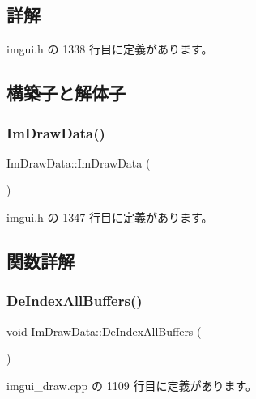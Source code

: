 \subsection{詳解}


 imgui.\+h の 1338 行目に定義があります。



\subsection{構築子と解体子}
\mbox{\label{struct_im_draw_data_a96b50c40107c997e9eea7ac3ba1a6138}} 
\subsubsection{\texorpdfstring{Im\+Draw\+Data()}{ImDrawData()}}
{\footnotesize\ttfamily Im\+Draw\+Data\+::\+Im\+Draw\+Data (\begin{DoxyParamCaption}{ }\end{DoxyParamCaption})\hspace{0.3cm}{\ttfamily [inline]}}



 imgui.\+h の 1347 行目に定義があります。



\subsection{関数詳解}
\mbox{\label{struct_im_draw_data_a88ae746e958b79ee527fe94dee29d57c}} 
\subsubsection{\texorpdfstring{De\+Index\+All\+Buffers()}{DeIndexAllBuffers()}}
{\footnotesize\ttfamily void Im\+Draw\+Data\+::\+De\+Index\+All\+Buffers (\begin{DoxyParamCaption}{ }\end{DoxyParamCaption})}



 imgui\+\_\+draw.\+cpp の 1109 行目に定義があります。

